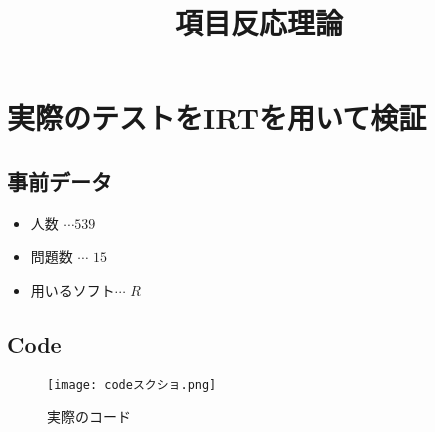\documentclass[12pt]{jarticle}
\title{項目反応理論}
\begin{document}
\maketitle
\section{実際のテストをIRTを用いて検証}
\subsection{事前データ}
\begin{itemize}
  \item 人数 $\cdots$$539$
  \item 問題数 $\cdots$ $15$
  \item 用いるソフト$\cdots$ $R$
\end{itemize}
\subsection{Code}
\vspace{1cm}
\begin{figure}[H]
  \texttt{[image: codeスクショ.png]}
  \vspace{4.8cm}
  \caption{実際のコード}
\end{figure}
\end{document}
